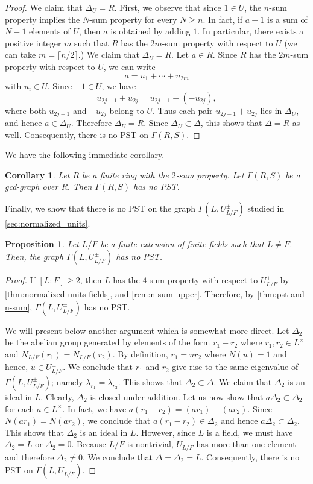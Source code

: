 \documentclass[11pt, a4paper]{amsart}
\newtheorem{prop}[thm]{Proposition}
\newtheorem{cor}[thm]{Corollary}
\theoremstyle{definition}
\numberwithin{equation}{section}
\begin{document}
\begin{proof}
We claim that $\Delta_U=R.$ First, we observe that since \(1\in U\), the \(n\)-sum property implies the \(N\)-sum property for every
\(N\geq n\). In fact, if \(a-1\) is a sum of \(N-1\) elements of \(U\), then \(a\) is
obtained by adding \(1\). In particular, there exists a positive integer $m$ such that $R$ has the $2m$-sum property with respect to $U$ (we can take $m= \lceil  n/2 \rceil.$) We claim that $\Delta_U=R$. Let \(a\in R\). Since \(R\) has the \(2m\)-sum property with respect to \(U\), we can write
\[
a=u_1+\cdots+u_{2m}
\]
with \(u_i\in U\). Since \(-1\in U\), we have
\[
u_{2j-1}+u_{2j}=u_{2j-1}-(-u_{2j}),
\]
where both \(u_{2j-1}\) and \(-u_{2j}\) belong to \(U\). Thus each pair
\(u_{2j-1}+u_{2j}\) lies in \(\Delta_U\), and hence \(a\in\Delta_U\). Therefore
\(\Delta_U=R\).
 Since $\Delta_U \subset \Delta$, this shows that $\Delta =R $ as well. Consequently, there is no PST on $\Gamma(R,S).$
\end{proof}
We have the following immediate corollary. 
\begin{cor}
    Let $R$ be a finite ring with the $2$-sum property. Let $\Gamma(R,S)$ be a gcd-graph over $R.$ Then $\Gamma(R,S)$ has no PST. 
\end{cor}

Finally, we show that there is no PST on the graph $\Gamma(L, U_{L/F}^{\pm})$ studied in \cref{sec:normalized_units}.
\begin{prop}
    Let $L/F$ be a finite extension of finite fields such that $L \neq F$. Then, the graph $\Gamma(L, U_{L/F}^{\pm})$ has no PST. 
\end{prop}

\begin{proof}
    If $[L:F] \geq 2$, then $L$ has the $4$-sum property with respect to $U_{L/F}^{\pm}$ by \cref{thm:normalized-units-fields}, and \cref{rem:n-sum-upper}. Therefore, by \cref{thm:pst-and-n-sum}, $\Gamma(L, U_{L/F}^{\pm})$ has no PST.
    
    
    We will present below another argument which is somewhat more direct.  Let $\Delta_2$ be the abelian group generated by elements of the form $r_1-r_2$ where $r_1, r_2 \in L^{\times}$ and $N_{L/F}(r_1)=N_{L/F}(r_2).$ By definition, $r_1 = ur_2$ where $N(u)=1$ and hence, $u \in U_{L/F}^{\pm}.$ We conclude that $r_1$ and $r_2$ give rise to the same eigenvalue of $\Gamma(L, U_{L/F}^{\pm})$; namely $\lambda_{r_1}=\lambda_{r_2}.$ This shows that $\Delta_2 \subset \Delta.$ We claim that $\Delta_2$ is an ideal in $L.$ Clearly, $\Delta_2$ is closed under addition. Let us now show that $a\Delta_2 \subset \Delta_2$ for each $a \in L^{\times}$. In fact, we have $a(r_1-r_2) =(ar_1)-(ar_2).$ Since $N(ar_1)=N(ar_2)$, we conclude that $a(r_1-r_2) \in \Delta_2$ and hence $a \Delta_2 \subset \Delta_2.$ This shows that $\Delta_2$ is an ideal in $L$. However, since $L$ is a field, we must have $\Delta_2=L$ or $\Delta_2=0$. Because \(L/F\) is nontrivial,  \(U_{L/F}\) has more than one element and  therefore \(\Delta_2\neq 0\). We conclude that $\Delta=\Delta_2=L.$ Consequently, there is no PST on $\Gamma(L, U_{L/F}^{\pm}).$    
\end{proof}
\end{document}
